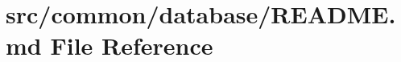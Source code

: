 \hypertarget{src_2common_2database_2README_8md}{}\section{src/common/database/\+R\+E\+A\+D\+ME.md File Reference}
\label{src_2common_2database_2README_8md}
